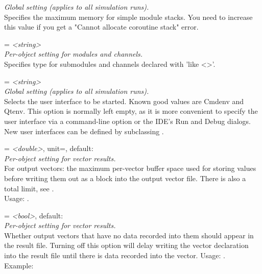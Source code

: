 \begin{description}
    \textit{Global setting (applies to all simulation runs).}\\
    Specifies the maximum memory for  simple module stacks. You
    need to increase this value if you get a "Cannot allocate coroutine stack"
    error.
\item[**.typename] = \textit{<string>}\\
    \textit{Per-object setting for modules and channels.}\\
    Specifies type for submodules and channels declared with 'like <>'.
\item[user-interface] = \textit{<string>}\\
    \textit{Global setting (applies to all simulation runs).}\\
    Selects the user interface to be started. Known good values are Cmdenv and
    Qtenv. This option is normally left empty, as it is more convenient to
    specify the user interface via a command-line option or the IDE's Run and
    Debug dialogs. New user interfaces can be defined by subclassing
    .
\item[**.vector-buffer] = \textit{<double>}, unit=, default: \\
    \textit{Per-object setting for vector results.}\\
    For output vectors: the maximum per-vector buffer space used for storing
    values before writing them out as a block into the output vector file.
    There is also a total limit, see
    .\\
    Usage:
    .
\item[**.vector-record-empty] = \textit{<bool>}, default: \\
    \textit{Per-object setting for vector results.}\\
    Whether output vectors that have no data recorded into them should appear
    in the result file. Turning off this option will delay writing the vector
    declaration into the result file until there is data recorded into the
    vector. Usage:
    .\\
    Example:

\end{description}
